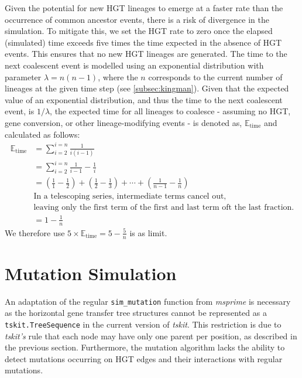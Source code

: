 Given the potential for new \ac{HGT} lineages to emerge at a faster rate than the occurrence of common ancestor events, there is a risk of divergence in the simulation.
To mitigate this, we set the \ac{HGT} rate to zero once the elapsed (simulated) time exceeds five times the time expected in the absence of \ac{HGT} events.
This ensures that no new \ac{HGT} lineages are generated.
The time to the next coalescent event is modelled using an exponential distribution with parameter $\lambda = n(n-1)$,
where the $n$ corresponds to the current number of lineages at the given time step  (see \ref{subsec:kingman}).
\newpage
Given that the expected value of an exponential distribution, and thus the time to the next coalescent event, is $1/\lambda$,
the expected time for all lineages to coalesce - assuming no \ac{HGT}, gene conversion, or other lineage-modifying events - is denoted as,
$\mathbb{E}_\text{time}$ and calculated as follows:
\begin{equation}
    \begin{split}
        \mathbb{E}_\text{time} & = \sum_{i=2}^{i=n} \frac{1}{i(i-1)}                                                                                                         \\
        & = \sum_{i=2}^{i=n} \frac{1}{i-1} - \frac{1}{i}                                                                                              \\
        & = \left( \frac{1}{1} - \frac{1}{2} \right) + \left( \frac{1}{2} - \frac{1}{3} \right) + \cdots + \left( \frac{1}{n-1} - \frac{1}{n} \right) \\
        & \text{In a telescoping series, intermediate terms cancel out,}                                                                              \\
        & \text{leaving only the first term of the first and last term oft the last fraction.}                                                        \\
        & = 1 - \frac{1}{n}
    \end{split}
\end{equation}
We therefore use $5\times\mathbb{E}_\text{time} = 5 - \frac{5}{n}$ is as limit.

\section{Mutation Simulation}

An adaptation of the regular \texttt{sim_mutation} function from \textit{msprime} is necessary as the horizontal gene transfer tree structures
cannot be represented as a \texttt{tskit.TreeSequence} in the current version of \textit{tskit}.
This restriction is due to \textit{tskit's} rule that each node may have only one parent per position, as described in the previous section.
Furthermore, the mutation algorithm lacks the ability to detect mutations occurring on \ac{HGT} edges and their interactions with regular mutations.

